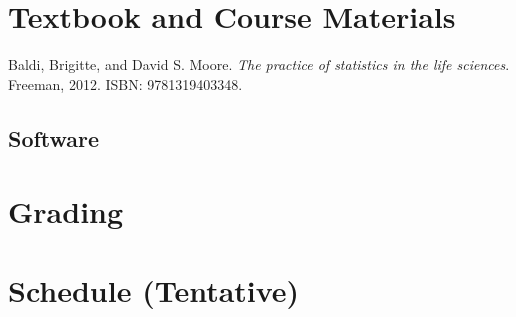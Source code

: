 \documentclass[11pt]{article}\usepackage[]{graphicx}\usepackage[]{xcolor}
\begin{document}
\section{Textbook and Course Materials}

\begin{hangparas}{0.25in}{1}
Baldi, Brigitte, and David S. Moore. \emph{The practice of statistics in the life sciences}. Freeman, 2012. ISBN: 9781319403348.
\end{hangparas}

\subsection{Software}

\section{Grading}

\section{Schedule (Tentative)}
\end{document}
